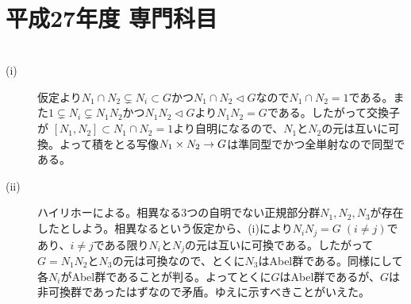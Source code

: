 \section{平成27年度 専門科目}

\subsubsection{}
\begin{sol} ${}$
  \begin{description}
    \item[(i)] 仮定より$N_1 \cap N_2 \subsetneq N_i \subset G$かつ$N_1 \cap N_2 \lhd G$なので$N_1 \cap N_2 = 1$である。また$1 \subsetneq N_i \subsetneq N_1 N_2 $かつ$N_1 N_2 \lhd G$より$N_1 N_2 = G$である。したがって交換子が
    $[N_1,N_2] \subset N_1 \cap N_2 = 1$より自明になるので、$N_1$と$N_2$の元は互いに可換。よって積をとる写像$N_1 \times N_2 \to G$は準同型でかつ全単射なので同型である。
    \item[(ii)] ハイリホーによる。相異なる$3$つの自明でない正規部分群$N_1, N_2, N_3$が存在したとしよう。相異なるという仮定から、(i)により$N_i N_j = G \; (i \neq j)$であり、$i \neq j$である限り$N_i$と$N_j$の元は互いに可換である。したがって$G = N_1 N_2$と$N_3$の元は可換なので、とくに$N_3$はAbel群である。同様にして各$N_i$がAbel群であることが判る。よってとくに$G$はAbel群であるが、$G$は非可換群であったはずなので矛盾。ゆえに示すべきことがいえた。
\end{description}
\end{sol}


\newpage


